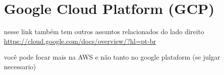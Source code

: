 \chapter{Google Cloud Platform (GCP)}

nesse link também tem outros assuntos relacionados do lado direito
\url{https://cloud.google.com/docs/overview/?hl=pt-br}

você pode focar mais na AWS e não tanto no google plataform (se julgar necessario)
